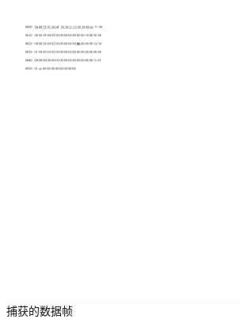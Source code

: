 \begin{figure}[h!]
    \begin{center}
        \includegraphics[width=0.7\textwidth]{pictures/framedata.pdf}
        \caption{捕获的数据帧}
        \label{framedata}
    \end{center}
\end{figure}
